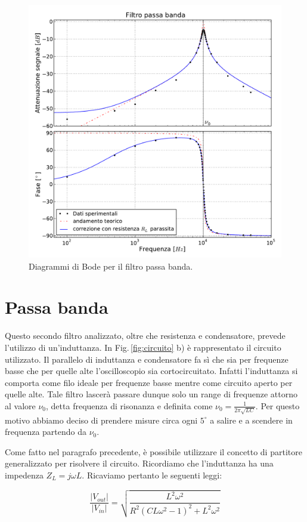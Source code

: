 \begin{figure}
    \includegraphics[width=115mm]{bpf2.pdf}
    \caption{Diagrammi di Bode per il filtro passa banda.}
    \label{fig:bpf}
\end{figure}

\section{Passa banda}
Questo secondo filtro analizzato, oltre che resistenza e condensatore, prevede l'utilizzo di un'induttanza. In Fig.$\,$\ref{fig:circuito} b) è rappresentato il circuito utilizzato. Il parallelo di induttanza e condensatore fa sì che sia per frequenze basse che per quelle alte l'oscilloscopio sia cortocircuitato. Infatti l'induttanza si comporta come filo ideale per frequenze basse mentre come circuito aperto per quelle alte. Tale filtro lascerà passare dunque solo un range di frequenze attorno al valore $\nu_0$, detta frequenza di risonanza e definita come $\nu_0=\frac{1}{2 \pi \sqrt{LC}}$. Per questo motivo abbiamo deciso di prendere misure circa ogni $5^\circ$ a salire e a scendere in frequenza partendo da $\nu_0$.

Come fatto nel paragrafo precedente, è possibile utilizzare il concetto di partitore generalizzato per risolvere il circuito. Ricordiamo che l'induttanza ha una impedenza $Z_L=j\omega L$. Ricaviamo pertanto le seguenti leggi:

\begin{equation}
\frac{|V_{out}|}{|V_{in}|}=\sqrt{\frac{L^2 \omega ^2}{R^2 \left(C L \omega ^2-1\right)^2+L^2 \omega ^2}}
\label{eq:bpfGain}
\end{equation}

